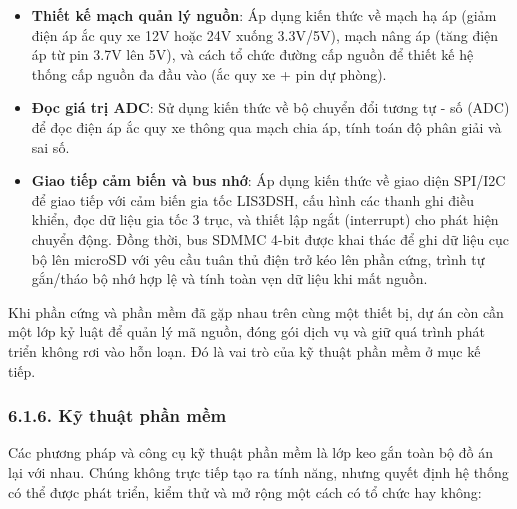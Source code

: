 \documentclass[a4paper]{extarticle}
\providecommand{\tightlist}{%
  \setlength{\itemsep}{0pt}\setlength{\parskip}{0pt}}
\begin{document}
\begin{itemize}
\tightlist
\item
  \textbf{Thiết kế mạch quản lý nguồn}: Áp dụng kiến thức về mạch hạ áp
  (giảm điện áp ắc quy xe 12V hoặc 24V xuống 3.3V/5V), mạch nâng áp
  (tăng điện áp từ pin 3.7V lên 5V), và cách tổ chức đường cấp nguồn để
  thiết kế hệ thống cấp nguồn đa đầu vào (ắc quy xe + pin dự phòng).
\item
  \textbf{Đọc giá trị ADC}: Sử dụng kiến thức về bộ chuyển đổi tương tự
  - số (ADC) để đọc điện áp ắc quy xe thông qua mạch chia áp, tính toán
  độ phân giải và sai số.
\item
  \textbf{Giao tiếp cảm biến và bus nhớ}: Áp dụng kiến thức về giao diện
  SPI/I2C để giao tiếp với cảm biến gia tốc LIS3DSH, cấu hình các thanh
  ghi điều khiển, đọc dữ liệu gia tốc 3 trục, và thiết lập ngắt
  (interrupt) cho phát hiện chuyển động. Đồng thời, bus SDMMC 4-bit được
  khai thác để ghi dữ liệu cục bộ lên microSD với yêu cầu tuân thủ
  điện trở kéo lên phần cứng, trình tự gắn/tháo bộ nhớ hợp lệ và tính toàn vẹn dữ liệu khi
  mất nguồn.
\end{itemize}

Khi phần cứng và phần mềm đã gặp nhau trên cùng một thiết bị, dự án còn
cần một lớp kỷ luật để quản lý mã nguồn, đóng gói dịch vụ và giữ quá
trình phát triển không rơi vào hỗn loạn. Đó là vai trò của kỹ thuật phần
mềm ở mục kế tiếp.

\subsubsection{6.1.6. Kỹ thuật phần
mềm}\label{616-kux1ef9-thuux1eadt-phux1ea7n-mux1ec1m}

Các phương pháp và công cụ kỹ thuật phần mềm là lớp keo gắn toàn bộ đồ
án lại với nhau. Chúng không trực tiếp tạo ra tính năng, nhưng quyết
định hệ thống có thể được phát triển, kiểm thử và mở rộng một cách có tổ
chức hay không:
\end{document}

